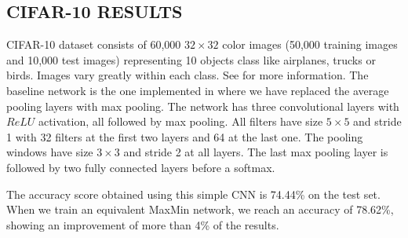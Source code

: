 \documentclass{article}
\begin{document}
\subsection{CIFAR-10 RESULTS}
CIFAR-10 dataset consists of 60,000 $32 \times 32$ color images (50,000 training images and 10,000 test images) representing 10 objects class like airplanes, trucks or birds. Images vary greatly within each class. See \cite{multicolumn} for more information. The baseline network is the one implemented in \cite{matconvnet} where we have replaced the average pooling layers with max pooling. The network has three convolutional layers with $ReLU$ activation, all followed by max pooling. All filters have size $5 \times 5$ and stride 1 with 32 filters at the first two layers and 64 at the last one. The pooling windows have size $3\times 3$ and stride 2 at all layers. The last max pooling layer is followed by two fully connected layers before a softmax. 

The accuracy score obtained using this simple CNN is 74.44\% on the test set.
When we train an equivalent MaxMin network, we reach an accuracy of 78.62\%, showing an improvement of more than 4\% of the results. 
\end{document}
